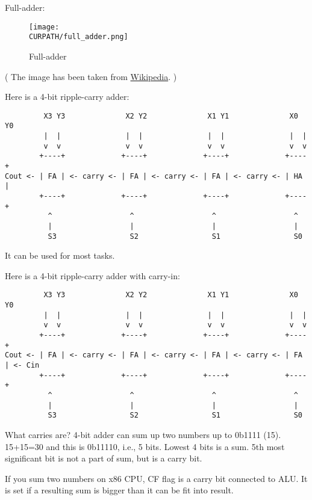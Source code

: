 Full-adder:

\begin{figure}[H]
\centering
\texttt{[image: \\CURPATH/full\_adder.png]}
\caption{Full-adder}
\end{figure}

( The image has been taken from \href{https://en.wikipedia.org/wiki/Adder_(electronics)}{Wikipedia}. )

Here is a 4-bit ripple-carry adder:

\begin{lstlisting}
         X3 Y3              X2 Y2              X1 Y1              X0 Y0
         |  |               |  |               |  |               |  |
         v  v               v  v               v  v               v  v
        +----+             +----+             +----+             +----+
Cout <- | FA | <- carry <- | FA | <- carry <- | FA | <- carry <- | HA |
        +----+             +----+             +----+             +----+
          ^                  ^                  ^                  ^
          |                  |                  |                  |
          S3                 S2                 S1                 S0
\end{lstlisting}

It can be used for most tasks.

Here is a 4-bit ripple-carry adder with carry-in:

\begin{lstlisting}
         X3 Y3              X2 Y2              X1 Y1              X0 Y0
         |  |               |  |               |  |               |  |
         v  v               v  v               v  v               v  v
        +----+             +----+             +----+             +----+
Cout <- | FA | <- carry <- | FA | <- carry <- | FA | <- carry <- | FA | <- Cin
        +----+             +----+             +----+             +----+
          ^                  ^                  ^                  ^
          |                  |                  |                  |
          S3                 S2                 S1                 S0
\end{lstlisting}

What carries are?
4-bit adder can sum up two numbers up to 0b1111 (15).
15+15=30 and this is 0b11110, i.e., 5 bits. Lowest 4 bits is a sum.
5th most significant bit is not a part of sum, but is a carry bit.

If you sum two numbers on x86 CPU, CF flag is a carry bit connected to \ac{ALU}.
It is set if a resulting sum is bigger than it can be fit into result.

